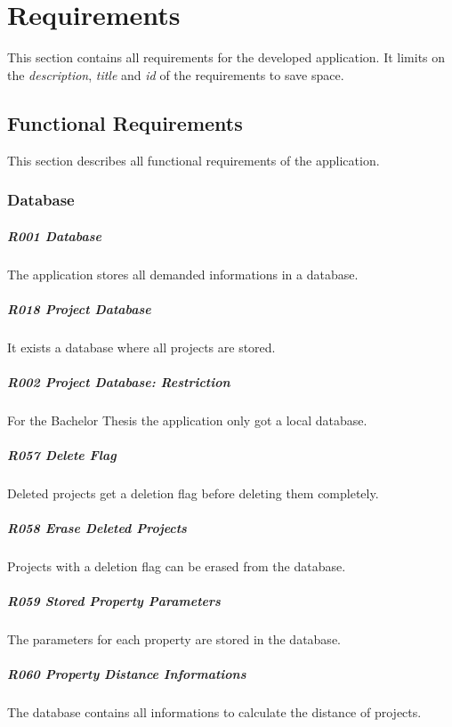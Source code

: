 \chapter{Requirements}
\label{app:RE}

This section contains all requirements for the developed application. It limits on the \textit{description}, \textit{title} and \textit{id} of the requirements to save space.

\section{Functional Requirements}
This section describes all functional requirements of the application.

\subsection{Database}
\paragraph{R001 Database}
The application stores all demanded informations in a database.
\paragraph{R018 Project Database}
It exists a database where all projects are stored.
\paragraph{R002 Project Database: Restriction}
For the Bachelor Thesis the application only got a local database.
\paragraph{R057 Delete Flag}
Deleted projects get a deletion flag before deleting them completely.
\paragraph{R058 Erase Deleted Projects}
Projects with a deletion flag can be erased from the database.
\paragraph{R059 Stored Property Parameters}
The parameters for each property are stored in the database.
\paragraph{R060 Property Distance Informations}
The database contains all informations to calculate the distance of projects.
